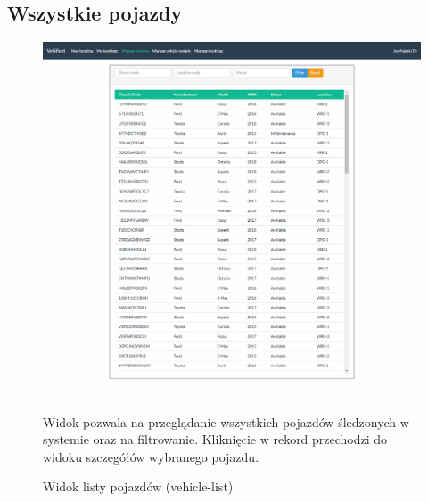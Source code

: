 \documentclass[eng,printmode,openany]{mgr}
\begin{document}
\subsection{Wszystkie pojazdy}
\begin{figure}[H]
	\centering
	\includegraphics[width=\textwidth]{images/views/vehicle-list.png}
	\caption{Widok listy pojazdów (vehicle-list)}
	\small 
	Widok pozwala na przeglądanie wszystkich pojazdów śledzonych w systemie oraz na filtrowanie. Kliknięcie w rekord przechodzi do widoku szczegółów wybranego pojazdu.
\end{figure}
\end{document}
